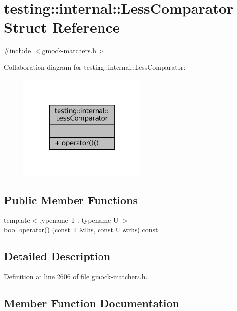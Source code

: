 \hypertarget{structtesting_1_1internal_1_1LessComparator}{}\section{testing\+:\+:internal\+:\+:Less\+Comparator Struct Reference}
\label{structtesting_1_1internal_1_1LessComparator}


{\ttfamily \#include $<$gmock-\/matchers.\+h$>$}



Collaboration diagram for testing\+:\+:internal\+:\+:Less\+Comparator\+:
\nopagebreak
\begin{figure}[H]
\begin{center}
\leavevmode
\includegraphics[width=180pt]{structtesting_1_1internal_1_1LessComparator__coll__graph}
\end{center}
\end{figure}
\subsection*{Public Member Functions}
\begin{DoxyCompactItemize}
\item 
{\footnotesize template$<$typename T , typename U $>$ }\\\hyperlink{classbool}{bool} \hyperlink{structtesting_1_1internal_1_1LessComparator_a03d072616e29586a62bd638e47d4a11c}{operator()} (const T \&lhs, const U \&rhs) const
\end{DoxyCompactItemize}


\subsection{Detailed Description}


Definition at line 2606 of file gmock-\/matchers.\+h.



\subsection{Member Function Documentation}
\mbox{\label{structtesting_1_1internal_1_1LessComparator_a03d072616e29586a62bd638e47d4a11c}} 
